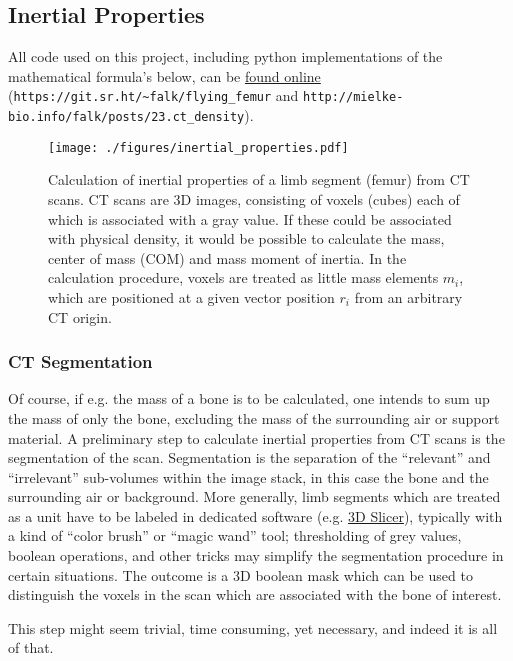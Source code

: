 \subsection{Inertial Properties}
\label{sec:orgcb7dc22}

All code used on this project, including python implementations of the mathematical formula's below, can be \href{https://git.sr.ht/\~falk/flying\_femur}{found online} (\nolinkurl{https://git.sr.ht/~falk/flying_femur} and \nolinkurl{http://mielke-bio.info/falk/posts/23.ct_density}).

\begin{figure}[htbp]
\centering
\texttt{[image: ./figures/inertial\_properties.pdf]}
\caption{\label{fig:inertials}Calculation of inertial properties of a limb segment (femur) from CT scans. CT scans are 3D images, consisting of voxels (cubes) each of which is associated with a gray value. If these could be associated with physical density, it would be possible to calculate the mass, center of mass (COM) and mass moment of inertia. In the calculation procedure, voxels are treated as little mass elements \(m_{i}\), which are positioned at a given vector position \(r_{i}\) from an arbitrary CT origin.}
\end{figure}

\subsubsection{CT Segmentation}
\label{sec:orga28902e}
Of course, if e.g. the mass of a bone is to be calculated, one intends to sum up the mass of only the bone, excluding the mass of the surrounding air or support material.
A preliminary step to calculate inertial properties from CT scans is the segmentation of the scan.
Segmentation is the separation of the ``relevant'' and ``irrelevant'' sub-volumes within the image stack, in this case the bone and the surrounding air or background.
More generally, limb segments which are treated as a unit have to be labeled in dedicated software (e.g. \href{https://www.slicer.org}{3D Slicer}), typically with a kind of ``color brush'' or ``magic wand'' tool; thresholding of grey values, boolean operations, and other tricks may simplify the segmentation procedure in certain situations.
The outcome is a 3D boolean mask which can be used to distinguish the voxels in the scan which are associated with the bone of interest.

This step might seem trivial, time consuming, yet necessary, and indeed it is all of that.


